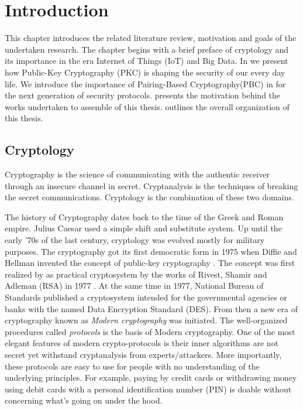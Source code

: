 \chapter{Introduction}
\label{chap:Introduction}
This chapter introduces the related literature review, motivation and goals of the undertaken research.
The chapter begins with a brief preface of cryptology and its importance in the era Internet of Things (IoT) and Big Data.
In  we present how Public-Key Cryptography (PKC) is shaping the security of our every day life.
We introduce the importance of Pairing-Based Cryptography(PBC) in  for the next generation of security protocols. 
 presents the motivation behind the works undertaken to assemble of this thesis.
 outlines the overall organization of this thesis.

\section{Cryptology}
\label{chap:sec:crypto}
Cryptography is the science of communicating with the authentic receiver through an insecure channel in secret. 
Cryptanalysis is the techniques of breaking the secret communications.
Cryptology is the combination of these two domains.

The history of Cryptography dates back to the time of the Greek and Roman empire.
Julius Caesar used a simple shift and substitute system.
Up until the early '70s of the last century, cryptology was evolved mostly for military purposes. 
The cryptography got its first democratic form in 1975 when Diffie and Hellman invented the concept of public-key cryptography \cite{diffie1976new}. 
The concept was first realized by as practical cryptosystem by the works of Rivest, Shamir and Adleman (RSA) in 1977 \cite{rivest1978method}.
At the same time in 1977, National Bureau of Standards published a cryptosystem intended for the governmental agencies or banks with the named Data Encryption Standard (DES).
From then a new era of cryptography known as \textit{Modern cryptography} was initiated.
The well-organized procedures called \textit{protocols} is the basis of Modern cryptography.
One of the most elegant features of modern crypto-protocols is their inner algorithms are not secret yet withstand cryptanalysis from experts/attackers.
More importantly, these protocols are easy to use for people with no understanding of the underlying principles.
For example, paying by credit cards or withdrawing money using debit cards with a personal identification number (PIN) is doable without concerning what’s going on under the hood. 

